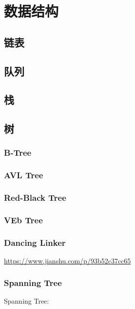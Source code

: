 \documentclass[12pt]{article}  %
\begin{document}
\section{数据结构}

\subsection{链表}

\subsection{队列}

\subsection{栈}

\subsection{树}

\subsubsection{B-Tree}

\subsubsection{AVL Tree}

\subsubsection{Red-Black Tree}

\subsubsection{VEb Tree}

\subsubsection{Dancing Linker}

\url{https://www.jianshu.com/p/93b52c37cc65}

\subsubsection{Spanning Tree}

Spanning Tree:
\end{document}
